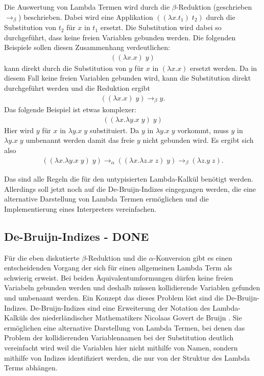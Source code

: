 \documentclass[ngerman]{article}
\newcommand{\doublelinebreak}{\par\vspace{\baselineskip}}
\begin{document}
Die Auswertung von Lambda Termen wird durch die $\beta$-Reduktion (geschrieben $\rightarrow_\beta$) beschrieben.
Dabei wird eine Applikation $((\lambda x.t_1) \; t_2)$ durch die Substitution von $t_2$ für $x$ in $t_1$ ersetzt. Die Substitution wird dabei so durchgeführt, dass keine freien Variablen gebunden werden. Die folgenden Beispiele sollen diesen Zusammenhang verdeutlichen:
\begin{align*}
    ((\lambda x.x) \; y)
\end{align*}
kann direkt durch die Substitution von $y$ für $x$ in $(\lambda x.x)$ ersetzt werden. Da in diesem Fall keine freien Variablen gebunden wird, kann die Substitution direkt durchgeführt werden und die Reduktion ergibt
\begin{align*}
    ((\lambda x.x) \; y) \rightarrow_\beta y.
\end{align*}
Das folgende Beispiel ist etwas komplexer:
\begin{align*}
    ((\lambda x.\lambda y.x \; y) \; y)
\end{align*}
Hier wird $y$ für $x$ in $\lambda y.x \; y$ substituiert. Da $y$ in $\lambda y.x \; y$ vorkommt, muss $y$ in $\lambda y.x \; y$ umbenannt werden damit das freie $y$ nicht gebunden wird. Es ergibt sich also
\begin{align*}
    ((\lambda x.\lambda y.x \; y) \; y) \rightarrow_\alpha ((\lambda x.\lambda z.x \; z) \; y) \rightarrow_\beta (\lambda z.y \; z).
\end{align*}

\doublelinebreak
Das sind alle Regeln die für den untypisierten Lambda-Kalkül benötigt werden.
Allerdings soll jetzt noch auf die De-Bruijn-Indizes eingegangen werden, die eine alternative Darstellung von Lambda Termen ermöglichen und die Implementierung eines Interpreters vereinfachen.

\subsection{De-Bruijn-Indizes - DONE}

Für die eben diskutierte $\beta$-Reduktion und die $\alpha$-Konversion gibt es einen entscheidenden Vorgang der sich für einen allgemeinen Lambda Term als schwierig erweist.
Bei beiden Äquivalentumformungen dürfen keine freien Variabeln gebunden werden und deshalb müssen kollidierende Variablen gefunden und umbenannt werden.
Ein Konzept das dieses Problem löst sind die De-Bruijn-Indizes.
De-Bruijn-Indizes sind eine Erweiterung der Notation des Lambda-Kalküls des niederländischer Mathematikers Nicolaas Govert de Bruijn \cite*{DEBRUIJN1972381}. Sie ermöglichen eine alternative Darstellung von Lambda Termen, bei denen das Problem der kollidierenden Variablennamen bei der Substitution deutlich vereinfacht wird weil die Variablen hier nicht mithilfe von Namen, sondern mithilfe von Indizes identifiziert werden, die nur von der Struktur des Lambda Terms abhängen.
\end{document}
